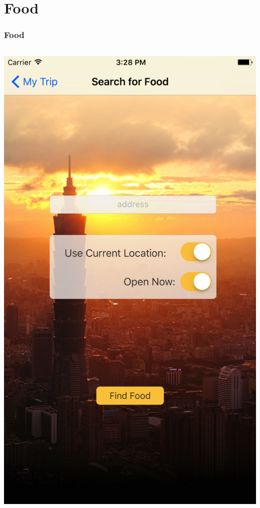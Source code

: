 \documentclass{beamer}
\begin{document}
\section{Food}
\begin{frame}
\frametitle{Food}
\begin{columns}
    \begin{column}{0.3\textwidth}
        \begin{center}
            \includegraphics[scale=0.08]{foodSearch}
        \end{center}

\end{column}
\end{columns}
\end{frame}
\end{document}
